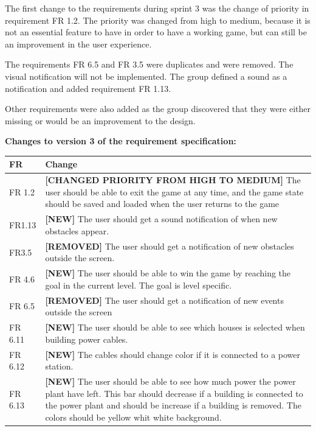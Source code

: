 	The first change to the requirements during sprint 3 was the change of priority in requirement FR 1.2. The priority was changed from high to medium, because it is not an essential feature to have in order to have a working game, but can still be an improvement in the user experience.

	The requirements FR 6.5 and FR 3.5 were duplicates and were removed. The visual notification will not be implemented. The group defined a sound as a notification and added requirement FR 1.13.

	Other requirements were also added as the group discovered that they were either missing or would be an improvement to the design.
	
	{\bf Changes to version 3 of the requirement specification:} \\
	\begin{tabular}{| p{1.5cm} | p{12cm} |}
		\hline
		\rowcolor{lightgray}
		{\bf FR} & {\bf Change} \\ \hline
		FR 1.2 & {\bf \color{orange}[CHANGED PRIORITY FROM HIGH TO MEDIUM]} The user should be able 
		to exit the game at any time, and the game state should be saved and loaded when the user 
		returns to the game \\ \hline
		FR1.13 & {\bf \color{green}[NEW]} The user should get a sound notification of when new obstacles appear. \\ \hline
		FR3.5 & {\bf \color{red}[REMOVED]}  The user should get a notification of new obstacles outside the screen. \\ \hline
		FR 4.6 & {\bf \color{green}[NEW]} The user should be able to win the game by reaching the goal in the current level. The goal is level specific. \\ \hline
		FR 6.5 & {\bf \color{red}[REMOVED]} The user should get a notification of new events outside 
		the screen \\ \hline
		FR 6.11 & {\bf \color{green}[NEW]} The user should be able to see which houses is selected when building power cables. \\ \hline
		FR 6.12 & {\bf \color{green}[NEW]} The cables should change color if it is connected to a power 
		station. \\ \hline
		FR 6.13 & {\bf \color{green}[NEW]} The user should be able to see how much power the 
		power plant have left. This bar should decrease if a building is connected to the power plant 
		and should be increase if a building is removed. The colors should be yellow whit white 
		background. \\ \hline
	\end{tabular}


